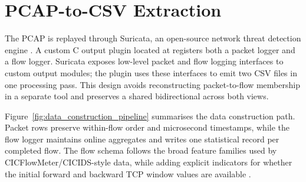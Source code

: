 \documentclass[11pt,fleqn]{report}
\begin{document}
\section{PCAP-to-CSV Extraction}
\label{subsec:pcap_extraction}

The PCAP is replayed through Suricata, an open-source network threat detection engine \cite{Roesch1999,SuricataGuide2026}. A custom C output plugin located at  registers both a packet logger and a flow logger. Suricata exposes low-level packet and flow logging interfaces to custom output modules; the plugin uses these interfaces to emit two CSV files in one processing pass. This design avoids reconstructing packet-to-flow membership in a separate tool and preserves a shared bidirectional  across both views.

Figure~\ref{fig:data_construction_pipeline} summarises the data construction path. Packet rows preserve within-flow order and microsecond timestamps, while the flow logger maintains online aggregates and writes one statistical record per completed flow. The flow schema follows the broad feature families used by CICFlowMeter/CICIDS-style data, while adding explicit indicators for whether the initial forward and backward TCP window values are available
\cite{Sharafaldin2018CICIDS}.
\end{document}
